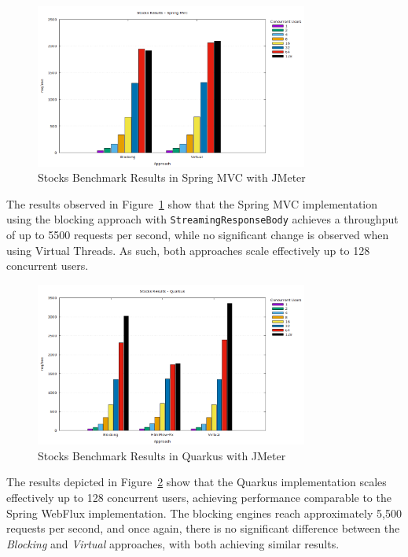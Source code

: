 \begin{figure}[h]
     \centering
     \includegraphics[width=0.8\textwidth]{./Graphs/stocks-springmvc-jmeter.png}
     \caption{Stocks Benchmark Results in Spring MVC with JMeter}\label{fig:stocks-springmvc-jmeter}
\end{figure}

The results observed in Figure~\ref{fig:stocks-springmvc-jmeter} show that the
Spring MVC implementation using the blocking approach with
\texttt{StreamingResponseBody} achieves a throughput of up to 5500 requests per
second, while no significant change is observed when using Virtual Threads. As
such, both approaches scale effectively up to 128 concurrent users.

\begin{figure}[h]
     \centering
     \includegraphics[width=0.8\textwidth]{./Graphs/stocks-quarkus-jmeter.png}
     \caption{Stocks Benchmark Results in Quarkus with JMeter}\label{fig:stocks-quarkus-jmeter}
\end{figure}

The results depicted in Figure~\ref{fig:stocks-quarkus-jmeter} show that the
Quarkus implementation scales effectively up to 128 concurrent users, achieving
performance comparable to the Spring WebFlux implementation. The blocking
engines reach approximately 5,500 requests per second, and once again, there is
no significant difference between the \textit{Blocking} and \textit{Virtual}
approaches, with both achieving similar results.


